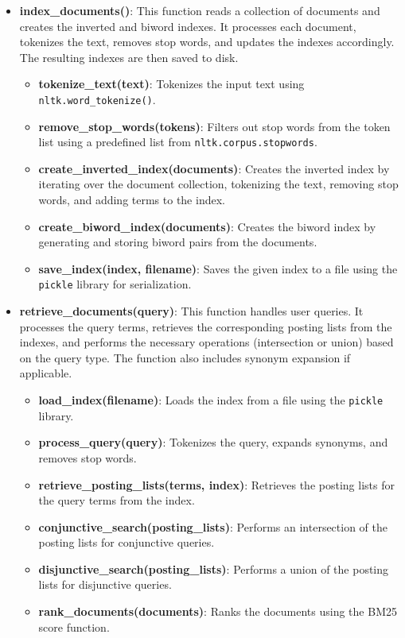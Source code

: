 \documentclass[a4paper,10pt]{article}
\begin{document}
\begin{itemize}
    \item \textbf{index\_documents()}: This function reads a collection of documents and creates the inverted and biword indexes. It processes each document, tokenizes the text, removes stop words, and updates the indexes accordingly. The resulting indexes are then saved to disk.
    \begin{itemize}
        \item \textbf{tokenize\_text(text)}: Tokenizes the input text using \texttt{nltk.word\_tokenize()}.
        \item \textbf{remove\_stop\_words(tokens)}: Filters out stop words from the token list using a predefined list from \texttt{nltk.corpus.stopwords}.
        \item \textbf{create\_inverted\_index(documents)}: Creates the inverted index by iterating over the document collection, tokenizing the text, removing stop words, and adding terms to the index.
        \item \textbf{create\_biword\_index(documents)}: Creates the biword index by generating and storing biword pairs from the documents.
        \item \textbf{save\_index(index, filename)}: Saves the given index to a file using the \texttt{pickle} library for serialization.
    \end{itemize}
    
    \item \textbf{retrieve\_documents(query)}: This function handles user queries. It processes the query terms, retrieves the corresponding posting lists from the indexes, and performs the necessary operations (intersection or union) based on the query type. The function also includes synonym expansion if applicable.
    \begin{itemize}
        \item \textbf{load\_index(filename)}: Loads the index from a file using the \texttt{pickle} library.
        \item \textbf{process\_query(query)}: Tokenizes the query, expands synonyms, and removes stop words.
        \item \textbf{retrieve\_posting\_lists(terms, index)}: Retrieves the posting lists for the query terms from the index.
        \item \textbf{conjunctive\_search(posting\_lists)}: Performs an intersection of the posting lists for conjunctive queries.
        \item \textbf{disjunctive\_search(posting\_lists)}: Performs a union of the posting lists for disjunctive queries.
        \item \textbf{rank\_documents(documents)}: Ranks the documents using the BM25 score function.
    \end{itemize}
    

\end{itemize}
\end{document}
